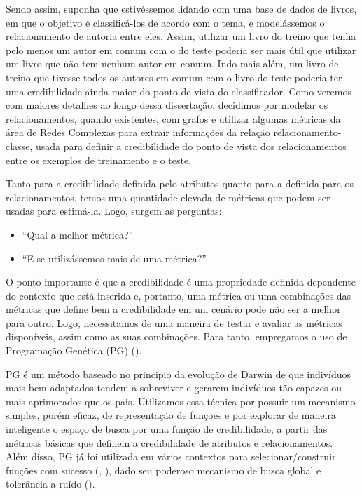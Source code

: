 Sendo assim, suponha que estivéssemos lidando com uma base de dados de livros, em que o objetivo é classificá-los de acordo com o tema, e modelássemos o relacionamento de autoria entre eles. Assim, utilizar um livro do treino que tenha pelo menos um autor em comum com o do teste poderia ser mais útil que utilizar um livro que não tem nenhum autor em comum. Indo mais além, um livro de treino que tivesse todos os autores em comum com o livro do teste poderia ter uma credibilidade ainda maior do ponto de vista do classificador. Como veremos com maiores detalhes ao longo dessa dissertação, decidimos por modelar os relacionamentos, quando existentes, com grafos e utilizar algumas métricas da área de Redes Complexas para extrair informações da relação relacionamento-classe, usada para definir a credibilidade do ponto de vista dos relacionamentos entre os exemplos de treinamento e o teste. 


Tanto para a credibilidade definida pelo atributos quanto para a definida para os relacionamentos, temos uma quantidade elevada de métricas que podem ser usadas para estimá-la. Logo, surgem as perguntas: 
\begin{itemize}
\item ``Qual a melhor métrica?''
\item ``E se utilizássemos mais de uma métrica?''
\end{itemize}
O ponto importante é que a credibilidade é uma propriedade definida dependente do contexto que está inserida e, portanto, uma métrica ou uma combinações das métricas que define bem a credibilidade em um cenário pode não ser a melhor para outro. Logo, necessitamos de uma maneira de testar e avaliar as métricas disponíveis, assim como as suas combinações. Para tanto, empregamos o uso de Programação Genética (\textsc{PG}) (\cite{Koza92}).

\textsc{PG} é um método baseado no principio da evolução de Darwin de que indivíduos mais bem adaptados tendem a sobreviver e gerarem indivíduos tão capazes ou mais aprimorados que os pais. 
Utilizamos essa técnica por possuir um mecanismo simples, porém eficaz, de representação de funções e por explorar de maneira inteligente o espaço de busca por uma função de credibilidade, 
a partir das métricas básicas que definem a credibilidade de atributos e relacionamentos. Além disso, \textsc{PG} já foi utilizada em vários contextos para selecionar/construir funções com sucesso (\cite{Golubski02}, \cite{Freitas10}), dado seu poderoso mecanismo de busca global e tolerância a ruído (\cite{Back00}).


